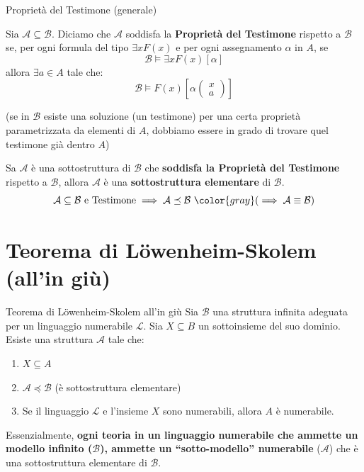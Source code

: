\documentclass[a4paper,11pt]{report}
\newcommand{\ass}[2]{%
    \left( \begin{smallmatrix} #1 \\ #2 \end{smallmatrix} \right)
}
\begin{document}
\begin{defframe}{Proprietà del Testimone (generale)}{}
    
Sia \(\mathcal{A} \subseteq \mathcal{B}\). Diciamo che \(\mathcal{A}\) soddisfa la \textbf{Proprietà del Testimone} rispetto a \(\mathcal{B}\) se, per ogni formula del tipo \(\exists x F(x)\) e per ogni assegnamento \(\alpha\) in \(A\), se
\[
\mathcal{B} \models \exists x F(x)[\alpha]
\]
allora  \(\exists a \in A\) tale che:
\[
    \mathcal{B} \models F(x)\left[\alpha\ass{x}{a}\right]
\]

{\color{gray}\small(se in \(\mathcal{B}\) esiste una soluzione (un testimone) per una certa proprietà parametrizzata da elementi di \(A\), dobbiamo essere in grado di trovare quel testimone già dentro \(A\))}
\end{defframe}

\begin{thmframe}{}{}
    Sa \(\mathcal{A}\) è una sottostruttura di \(\mathcal{B}\) che \textbf{soddisfa la Proprietà del Testimone} rispetto a \(\mathcal{B}\), allora \(\mathcal{A}\) è una \textbf{sottostruttura elementare} di \(\mathcal{B}\).
\[
    \mathcal{A} \subseteq \mathcal{B} \text{ e Testimone} \implies \mathcal{A} \preceq \mathcal{B} \ \color{gray}(\implies \mathcal{A} \equiv \mathcal{B})
\]
\end{thmframe}

\newpage
\section{Teorema di Löwenheim-Skolem (all'in giù)}

\begin{thmframe}{Teorema di Löwenheim-Skolem all'in giù}{}
Sia \(\mathcal{B}\) una struttura infinita adeguata per un linguaggio numerabile \(\mathcal{L}\). Sia \(X \subseteq B\) un sottoinsieme del suo dominio. Esiste una struttura \(\mathcal{A}\) tale che:
\begin{enumerate}
    \item \(X \subseteq A\)
    \item \(\mathcal{A} \preceq \mathcal{B}\) (è sottostruttura elementare)
    \item Se il linguaggio \(\mathcal{L}\) e l'insieme \(X\) sono numerabili, allora \(A\) è numerabile.
\end{enumerate}

Essenzialmente, \textbf{ogni teoria in un linguaggio numerabile che ammette un modello infinito (\(\mathcal{B}\)), ammette un ``sotto-modello'' numerabile} (\(\mathcal{A}\)) che è una sottostruttura elementare di \(\mathcal{B}\).

\end{thmframe}
\end{document}
